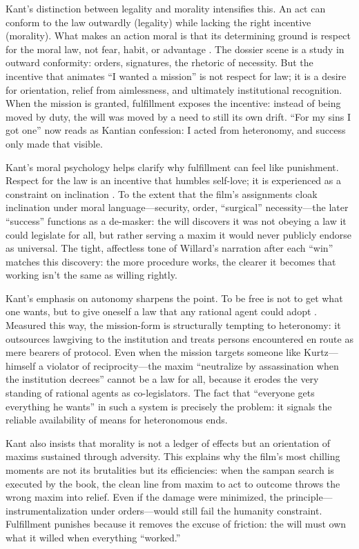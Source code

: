 Kant's distinction between legality and morality intensifies this. An act can conform to the
law outwardly (legality) while lacking the right incentive (morality). What makes an action
moral is that its determining ground is respect for the moral law, not fear, habit, or advantage
\parencite[pp.~72--76]{KantCPrR1996}. The dossier scene is a study in outward conformity:
orders, signatures, the rhetoric of necessity. But the incentive that animates ``I wanted a
mission'' is not respect for law; it is a desire for orientation, relief from aimlessness,
and ultimately institutional recognition. When the mission is granted, fulfillment exposes
the incentive: instead of being moved by duty, the will was moved by a need to still its own
drift. ``For my sins I got one'' now reads as Kantian confession: I acted from heteronomy,
and success only made that visible.

Kant's moral psychology helps clarify why fulfillment can feel like punishment. Respect for
the law is an incentive that humbles self-love; it is experienced as a constraint on inclination
\parencite[pp.~70--73]{KantCPrR1996}. To the extent that the film's assignments cloak
inclination under moral language—security, order, ``surgical'' necessity—the later ``success''
functions as a de-masker: the will discovers it was not obeying a law it could legislate for
all, but rather serving a maxim it would never publicly endorse as universal. The tight,
affectless tone of Willard's narration after each ``win'' matches this discovery: the more
procedure works, the clearer it becomes that working isn't the same as willing rightly.

Kant's emphasis on autonomy sharpens the point. To be free is not to get what one wants, but
to give oneself a law that any rational agent could adopt \parencite[pp.~30--33]{KantCPrR1996}.
Measured this way, the mission-form is structurally tempting to heteronomy: it outsources
lawgiving to the institution and treats persons encountered en route as mere bearers of protocol.
Even when the mission targets someone like Kurtz—himself a violator of reciprocity—the maxim
``neutralize by assassination when the institution decrees'' cannot be a law for all, because
it erodes the very standing of rational agents as co-legislators. The fact that ``everyone gets
everything he wants'' in such a system is precisely the problem: it signals the reliable
availability of means for heteronomous ends.

Kant also insists that morality is not a ledger of effects but an orientation of maxims
sustained through adversity. This explains why the film's most chilling moments are not its
brutalities but its efficiencies: when the sampan search is executed by the book, the clean
line from maxim to act to outcome throws the wrong maxim into relief. Even if the damage were
minimized, the principle—instrumentalization under orders—would still fail the humanity
constraint. Fulfillment punishes because it removes the excuse of friction: the will must own
what it willed when everything ``worked.''

